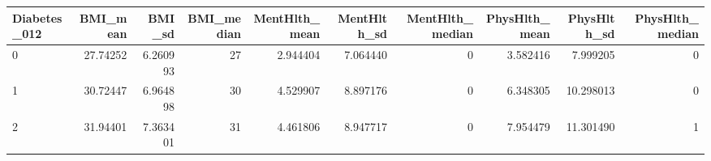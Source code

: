 
\begin{tabular}{lrrrrrrrrr}
\toprule
Diabetes\_012 & BMI\_mean & BMI\_sd & BMI\_median & MentHlth\_mean & MentHlth\_sd & MentHlth\_median & PhysHlth\_mean & PhysHlth\_sd & PhysHlth\_median\\
\midrule
0 & 27.74252 & 6.260993 & 27 & 2.944404 & 7.064440 & 0 & 3.582416 & 7.999205 & 0\\
1 & 30.72447 & 6.964898 & 30 & 4.529907 & 8.897176 & 0 & 6.348305 & 10.298013 & 0\\
2 & 31.94401 & 7.363401 & 31 & 4.461806 & 8.947717 & 0 & 7.954479 & 11.301490 & 1\\
\bottomrule
\end{tabular}
